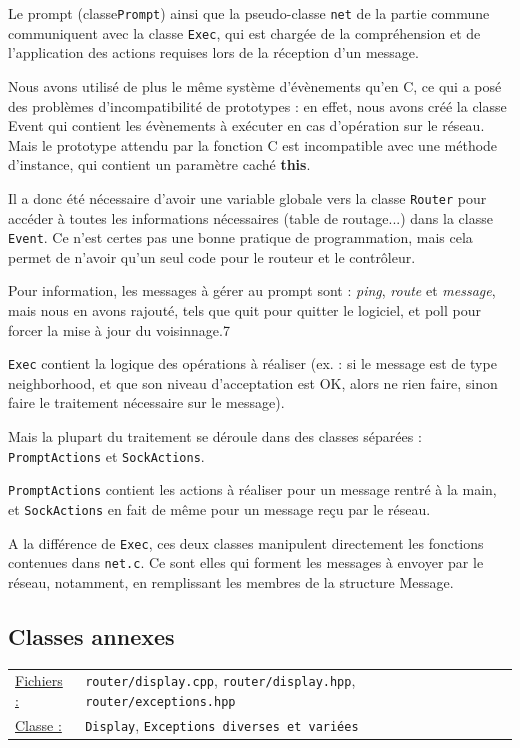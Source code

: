 \documentclass[a4paper,11pt]{article}
\begin{document}
Le prompt (classe\texttt{Prompt}) ainsi que la pseudo-classe \texttt{net} de la partie commune communiquent avec la classe \texttt{Exec},
 qui est chargée de la compréhension et de l'application des actions requises lors de la réception d'un message.

Nous avons utilisé de plus le même système d'évènements qu'en C, ce qui a posé des problèmes d'incompatibilité de prototypes : en effet,
nous avons créé la classe Event qui contient les évènements à exécuter en cas d'opération sur le réseau. Mais le prototype attendu par la fonction C
est incompatible avec une méthode d'instance, qui contient un paramètre caché \textbf{this}.

Il a donc été nécessaire d'avoir une variable globale vers la classe \texttt{Router} pour accéder à toutes les informations nécessaires (table de routage...) dans la classe \texttt{Event}.
Ce n'est certes pas une bonne pratique de programmation, mais cela permet de n'avoir qu'un seul code pour le routeur et le contrôleur.

Pour information, les messages à gérer au prompt sont : \textit{ping}, \textit{route} et \textit{message}, mais nous en avons rajouté, tels que quit pour quitter le logiciel, et poll pour forcer la mise à jour du voisinnage.7

\texttt{Exec} contient la logique des opérations à réaliser (ex. : si le message est de type neighborhood, et que son niveau d'acceptation est OK, alors ne rien faire, sinon faire le traitement nécessaire sur le message).

Mais la plupart du traitement se déroule dans des classes séparées : \texttt{PromptActions} et \texttt{SockActions}.

\texttt{PromptActions} contient les actions à réaliser pour un message rentré à la main, et \texttt{SockActions} en fait de
même pour un message reçu par le réseau.

A la différence de \texttt{Exec}, ces deux classes manipulent directement les fonctions contenues dans \texttt{net.c}.
Ce sont elles qui forment les messages à envoyer par le réseau, notamment, en remplissant les membres de la structure Message.

\subsection{Classes annexes}

\begin{tabularx}{\linewidth}{lX}
\underline{Fichiers :} & \texttt{router/display.cpp}, \texttt{router/display.hpp}, \texttt{router/exceptions.hpp}\\
\underline{Classe :} & \texttt{Display}, \texttt{Exceptions diverses et variées}\\
\end{tabularx}\\
\end{document}
